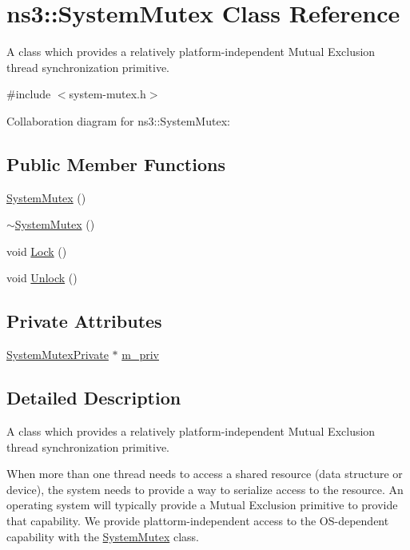 \hypertarget{classns3_1_1SystemMutex}{}\section{ns3\+:\+:System\+Mutex Class Reference}
\label{classns3_1_1SystemMutex}


A class which provides a relatively platform-\/independent Mutual Exclusion thread synchronization primitive.  




{\ttfamily \#include $<$system-\/mutex.\+h$>$}



Collaboration diagram for ns3\+:\+:System\+Mutex\+:
\subsection*{Public Member Functions}
\begin{DoxyCompactItemize}
\item 
\hyperlink{classns3_1_1SystemMutex_adecc3fb6a8d2829963cb18de461a436c}{System\+Mutex} ()
\item 
\hyperlink{classns3_1_1SystemMutex_a75b5d7bff7d20548bfc7cbb930e27fe2}{$\sim$\+System\+Mutex} ()
\item 
void \hyperlink{classns3_1_1SystemMutex_a28900ef4479f872b78eb3467ad27157a}{Lock} ()
\item 
void \hyperlink{classns3_1_1SystemMutex_a8004da6c8f1904efb14161455e0e06bc}{Unlock} ()
\end{DoxyCompactItemize}
\subsection*{Private Attributes}
\begin{DoxyCompactItemize}
\item 
\hyperlink{classns3_1_1SystemMutexPrivate}{System\+Mutex\+Private} $\ast$ \hyperlink{classns3_1_1SystemMutex_a1c11198da714f582c6540f0dd9385650}{m\+\_\+priv}
\end{DoxyCompactItemize}


\subsection{Detailed Description}
A class which provides a relatively platform-\/independent Mutual Exclusion thread synchronization primitive. 

When more than one thread needs to access a shared resource (data structure or device), the system needs to provide a way to serialize access to the resource. An operating system will typically provide a Mutual Exclusion primitive to provide that capability. We provide plattorm-\/independent access to the O\+S-\/dependent capability with the \hyperlink{classns3_1_1SystemMutex}{System\+Mutex} class.


